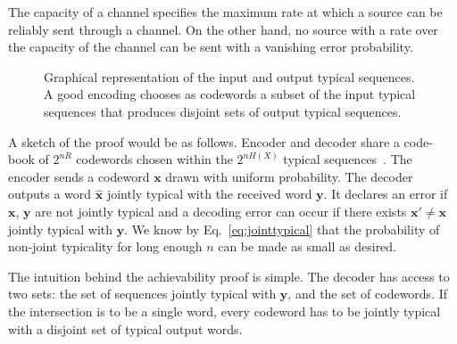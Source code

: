 
The capacity of a channel specifies the maximum rate at which a source can be reliably sent through a channel. On the other hand, no source with a rate over the capacity of the channel can be sent with a vanishing error probability.

\begin{figure}
\begin{center}
\def\svgwidth{\columnwidth} 
 
\caption[Jointly typical sequences]{Graphical representation of the input and output typical sequences. A good encoding chooses as codewords a subset of the input typical sequences that produces disjoint sets of output typical sequences.}
\label{fig:channel}
\end{center}
\end{figure}

A sketch of the proof would be as follows. Encoder and decoder share a code-book of $2^{nR}$ codewords chosen within the $2^{nH(X)}$ typical sequences~\cite{Massey_77}. The encoder sends a codeword $\mathbf{x}$ drawn with uniform probability. The decoder outputs a word $\hat{\mathbf{x}}$ jointly typical with the received word $\mathbf{y}$. It declares an error if $\mathbf{x}$, $\mathbf{y}$ are not jointly typical and a decoding error can occur if there exists $\mathbf{x}'\neq \mathbf{x}$ jointly typical with $\mathbf{y}$. We know by Eq.~\ref{eq:jointtypical} that the probability of non-joint typicality for long enough $n$ can be made as small as desired. %


The intuition behind the achievability proof is simple. The decoder has access to two sets: the set of sequences jointly typical with $\mathbf{y}$, and the set of codewords. If the intersection is to be a single word, every codeword has to be jointly typical with a disjoint set of typical output words. 

